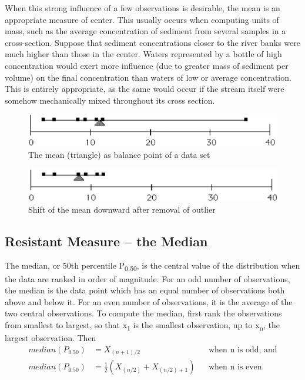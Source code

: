 \documentclass[]{book}
\begin{document}
When this strong influence of a few observations is desirable, the mean is an appropriate measure of center. This usually occurs when computing units of mass, such as the average concentration of sediment from several samples in a cross-section. Suppose that sediment
concentrations closer to the river banks were much higher than those in the center. Waters represented by a bottle of high concentration would exert more influence (due to greater mass of sediment per volume) on the final concentration than waters of low or average concentration. This is entirely appropriate, as the same would occur if the stream itself were somehow mechanically mixed throughout its cross section.

\begin{figure}

{\centering \includegraphics{figures/1_3_a} 

}

\caption{The mean (triangle) as balance point of a data set}\label{fig:fig-1-3-1}
\end{figure}
\begin{figure}

{\centering \includegraphics{figures/1_3_b} 

}

\caption{Shift of the mean downward after removal of outlier}\label{fig:fig-1-3-2}
\end{figure}

\hypertarget{resistant-measure-the-median}{%
\subsection{Resistant Measure -- the Median}\label{resistant-measure-the-median}}

The median, or 50th percentile P\textsubscript{0.50}, is the central value of the distribution when the data are ranked in order of magnitude. For an odd number of observations, the median is the data point which has an equal number of observations both above and below it. For an even number of observations, it is the average of the two central observations. To compute the median, first rank the observations from smallest to largest, so that x\textsubscript{1} is the smallest observation, up to x\textsubscript{n}, the largest observation. Then
\begin{equation}
\begin{aligned}
median \left(P_{0.50} \right) & = X_{(n+1)/2} && \text{when n is odd, and}\\
median \left(P_{0.50} \right) & = \frac{1}{2} \left( X_{(n/2)} +  X_{(n/2) + 1} \right) && \text{when n is even}
\end{aligned}
\label{eq:1-4}
\end{equation}
\end{document}
